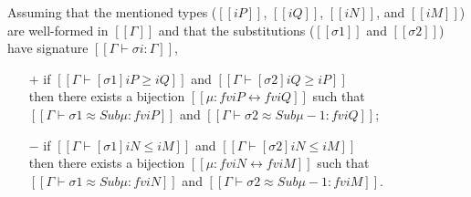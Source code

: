 \begin{lemma} \label{lemma:mutual-subst-subtyping}
  Assuming that the mentioned types ($[[iP]]$, $[[iQ]]$, $[[iN]]$, and $[[iM]]$)
  are well-formed in $[[Γ]]$ and that the substitutions ($[[σ1]]$ and $[[σ2]]$) have signature $[[Γ ⊢ σi : Γ]]$,
  \begin{itemize}
  \item[$+$] if $[[Γ ⊢ [σ1] iP ≥ iQ]]$ and $[[Γ ⊢ [σ2] iQ ≥ iP]]$\\
    then there exists a bijection $[[μ : fv iP ↔ fv iQ]]$ such that
    $[[Γ ⊢ σ1 ≈ Sub μ :  fv iP]]$ and $[[Γ ⊢ σ2 ≈ Sub μ-1 :  fv iQ]]$;
  \item[$-$] if $[[Γ ⊢ [σ1] iN ≤ iM]]$ and $[[Γ ⊢ [σ2] iN ≤ iM]]$\\
    then there exists a bijection $[[μ : fv iN ↔ fv iM]]$ such that
    $[[Γ ⊢ σ1 ≈ Sub μ :  fv iN]]$ and $[[Γ ⊢ σ2 ≈ Sub μ-1 :  fv iM]]$.
  \end{itemize}
\end{lemma}
